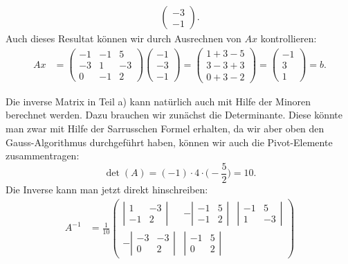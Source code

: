 \begin{loesung}
\begin{teilaufgaben}
\begin{align*}
\begin{pmatrix}
-3\\
-1
\end{pmatrix}.
\end{align*}
Auch dieses Resultat können wir durch Ausrechnen von $Ax$ kontrollieren:
\begin{align*}
Ax
&=
\begin{pmatrix}
  -1& -1&  5\\
  -3&  1& -3\\
   0& -1&  2
\end{pmatrix}
\begin{pmatrix}
-1\\-3\\-1
\end{pmatrix}
=
\begin{pmatrix}
1+3-5\\
3-3+3\\
0+3-2
\end{pmatrix}
=
\begin{pmatrix}
-1\\3\\1
\end{pmatrix}
=b.
\end{align*}
\end{teilaufgaben}
Die inverse Matrix in Teil a) kann natürlich auch mit Hilfe der
Minoren berechnet werden.
Dazu brauchen wir zunächst die Determinante.
Diese könnte man zwar mit
Hilfe der Sarrusschen Formel erhalten, da wir aber oben den Gauss-Algorithmus
durchgeführt haben, können wir auch die Pivot-Elemente zusammentragen:
\[
\det(A)
=
(-1)\cdot 4\cdot \biggl(-\frac52\biggr)
=
10.
\]
Die Inverse kann man jetzt direkt hinschreiben:
\begin{align*}
A^{-1}
&=
\frac1{10}
\begin{pmatrix}
\left|\begin{matrix} 1&-3\\-1& 2\end{matrix}\right|&
-\left|\begin{matrix}-1& 5\\-1& 2\end{matrix}\right|&
\left|\begin{matrix}-1& 5\\ 1&-3\end{matrix}\right|\\
-\left|\begin{matrix}-3&-3\\ 0& 2\end{matrix}\right|&
\left|\begin{matrix}-1& 5\\ 0& 2\end{matrix}\right|&

\end{pmatrix}
\end{align*}
\end{loesung}
